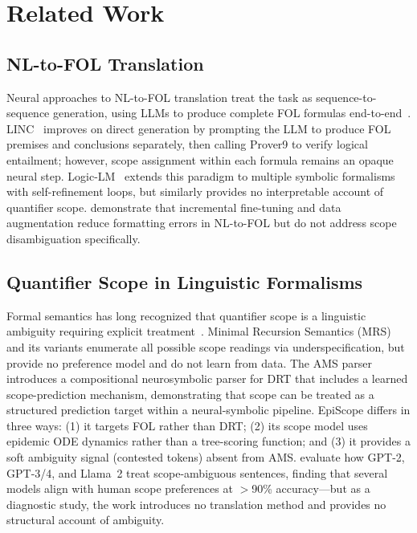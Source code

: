 \documentclass[11pt,letterpaper]{article}
\begin{document}
\section{Related Work}

\subsection{NL-to-FOL Translation}

Neural approaches to NL-to-FOL translation treat the task as sequence-to-sequence generation, using LLMs to
produce complete FOL formulas end-to-end~\citep{Pan2023,Thatikonda2024}. LINC~\citep{Olausson2023} improves on
direct generation by prompting the LLM to produce FOL premises and conclusions separately, then calling Prover9
to verify logical entailment; however, scope assignment within each formula remains an opaque neural step.
Logic-LM~\citep{Pan2023} extends this paradigm to multiple symbolic formalisms with self-refinement loops, but
similarly provides no interpretable account of quantifier scope. \citet{Thatikonda2024} demonstrate that
incremental fine-tuning and data augmentation reduce formatting errors in NL-to-FOL but do not address scope
disambiguation specifically.

\subsection{Quantifier Scope in Linguistic Formalisms}

Formal semantics has long recognized that quantifier scope is a linguistic ambiguity requiring explicit
treatment~\citep{Copestake2005}. Minimal Recursion Semantics (MRS)~\citep{Copestake2005} and its variants
enumerate all possible scope readings via underspecification, but provide no preference model and do not learn
from data. The AMS parser~\citep{Yang2024} introduces a compositional neurosymbolic parser for DRT that includes
a learned scope-prediction mechanism, demonstrating that scope can be treated as a structured prediction target
within a neural-symbolic pipeline. EpiScope differs in three ways: (1) it targets FOL rather than DRT; (2) its
scope model uses epidemic ODE dynamics rather than a tree-scoring function; and (3) it provides a soft ambiguity
signal (contested tokens) absent from AMS. \citet{Kamath2024} evaluate how GPT-2, GPT-3/4, and Llama~2 treat
scope-ambiguous sentences, finding that several models align with human scope preferences at $>$90\%
accuracy---but as a diagnostic study, the work introduces no translation method and provides no structural
account of ambiguity.
\end{document}
